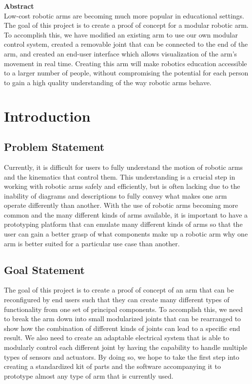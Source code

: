 \noindent \textbf{\Large Abstract} \\
\noindent Low-cost robotic arms are becoming much more popular in educational settings. The goal of this project is to create a proof of concept for a modular robotic arm. To accomplish this, we have modified an existing arm to use our own modular control system, created a removable joint that can be connected to the end of the arm, and created an end-user interface which allows visualization of the arm’s movement in real time. Creating this arm will make robotics education accessible to a larger number of people, without compromising the potential for each person to gain a high quality understanding of the way robotic arms behave. \\
\newpage

\section{Introduction} 

\subsection{Problem Statement}
\noindent Currently, it is difficult for users to fully understand the motion of robotic arms and the kinematics that control them. This understanding is a crucial step in working with robotic arms safely and efficiently, but is often lacking due to the inability of diagrams and descriptions to fully convey what makes one arm operate differently than another. With the use of robotic arms becoming more common and the many different kinds of arms available, it is important to have a prototyping platform that can emulate many different kinds of arms so that the user can gain a better grasp of what components make up a robotic arm why one arm is better suited for a particular use case than another.

\subsection{Goal Statement}
The goal of this project is to create a proof of concept of an arm that can be reconfigured by end users such that they can create many different types of functionality from one set of principal components. To accomplish this, we need to break the arm down into small modularized joints that can be rearranged to show how the combination of different kinds of joints can lead to a specific end result. We also need to create an adaptable electrical system that is able to modularly control each different joint by having the capability to handle multiple types of sensors and actuators. By doing so, we hope to take the first step into creating a standardized kit of parts and the software accompanying it to prototype almost any type of arm that is currently used. 

